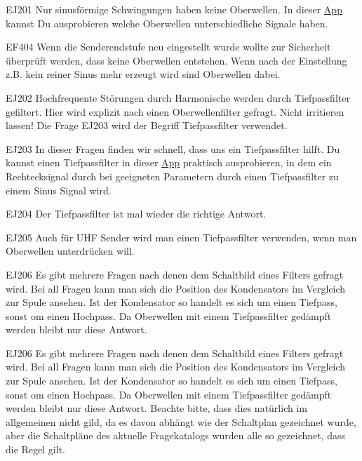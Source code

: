 \documentclass[10pt,a4paper,ngerman]{article}
\theoremstyle{definition}
\theoremstyle{plain}
\theoremstyle{mytheorem}
\theoremstyle{definition}
\begin{document}
\begin{sol}{EJ201}
Nur sinusförmige Schwingungen haben keine Oberwellen. In dieser 
\href{https://fritzsche.github.io/klasse-e/oberwelle.html}{App} kannst Du ausprobieren welche Oberwellen unterschiedliche Signale haben.

\end{sol}  

\begin{sol}{EF404}
Wenn die Senderendstufe neu eingestellt wurde wollte zur Sicherheit überprüft werden, dass keine Oberwellen entstehen.
Wenn nach der Einstellung z.B. kein reiner Sinus mehr erzeugt wird sind Oberwellen dabei.
\end{sol}  


\begin{sol}{EJ202}
Hochfrequente Störungen durch Harmonische werden durch Tiefpassfilter gefiltert. Hier wird explizit nach einen Oberwellenfilter gefragt. Nicht irritieren lassen!
Die Frage EJ203 wird der Begriff Tiefpassfilter verwendet.
\end{sol} 

\begin{sol}{EJ203}
In dieser Fragen finden wir schnell, dass uns ein Tiefpassfilter hilft.
Du kannst einen Tiefpassfilter in dieser \href{https://fritzsche.github.io/klasse-e/lpf.html}{App}
praktisch ausprobieren, in dem ein Rechtecksignal durch bei geeigneten Parametern durch einen Tiefpassfilter zu einem Sinus Signal wird.
\end{sol}  

\begin{sol}{EJ204}
Der Tiefpassfilter ist mal wieder die richtige Antwort.
\end{sol}  


\begin{sol}{EJ205}
Auch für UHF Sender wird man einen Tiefpassfilter verwenden, wenn man Oberwellen unterdrücken will.
\end{sol}  


\begin{sol}{EJ206}
Es gibt mehrere Fragen nach denen dem Schaltbild eines Filters gefragt wird. Bei all Fragen kann man sich die Position des Kondensators im Vergleich zur Spule ansehen. Ist der Kondensator  so handelt es sich um einen Tiefpass, sonst om einen Hochpass.
Da Oberwellen mit einem Tiefpassfilter gedämpft werden bleibt nur diese Antwort.
\end{sol}  

\begin{sol}{EJ206}
Es gibt mehrere Fragen nach denen dem Schaltbild eines Filters gefragt wird. Bei all Fragen kann man sich die Position des Kondensators im Vergleich zur Spule ansehen. Ist der Kondensator  so handelt es sich um einen Tiefpass, sonst om einen Hochpass.
Da Oberwellen mit einem Tiefpassfilter gedämpft werden bleibt nur diese Antwort. Beachte bitte, dass dies natürlich im allgemeinen nicht gild, da es davon abhängt wie der Schaltplan gezeichnet wurde, aber die Schaltpläne des aktuelle Fragekatalogs wurden alle so gezeichnet, dass die Regel gilt. 
\end{sol}  
\end{document}
